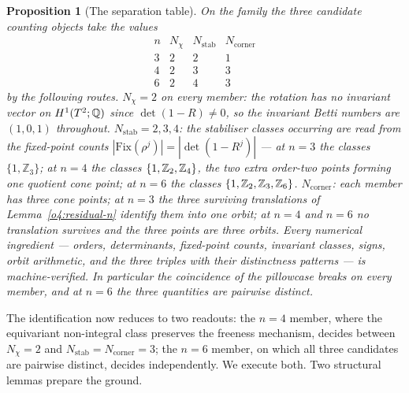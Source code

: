 \documentclass[11pt]{article}
\numberwithin{equation}{section}
\theoremstyle{plain}
\newtheorem{proposition}[theorem]{Proposition}
\theoremstyle{definition}
\theoremstyle{remark}
\newcommand{\Zn}[1][n]{\mathbb{Z}_{#1}}
\begin{document}
\begin{proposition}[The separation table]\label{o4:table}
On the family the three candidate counting objects take the values
\[
\begin{array}{c|ccc}
n & N_{\chi} & N_{\mathrm{stab}} & N_{\mathrm{corner}} \\ \hline
3 & 2 & 2 & 1 \\
4 & 2 & 3 & 3 \\
6 & 2 & 4 & 3
\end{array}
\]
by the following routes. $N_{\chi} = 2$ on every member: the
rotation has no invariant vector on $H^{1}(T^2; \mathbb{Q})$ since
$\det(1 - R) \neq 0$, so the invariant Betti numbers are
$(1, 0, 1)$ throughout. $N_{\mathrm{stab}} = 2, 3, 4$: the
stabiliser classes occurring are read from the fixed-point counts
$|\mathrm{Fix}(\rho^{j})| = |\det(1 - R^{j})|$ --- at $n = 3$ the
classes $\{1, \Zn[3]\}$; at $n = 4$ the classes
$\{1, \Ztwo, \Zn[4]\}$, the two extra order-two points forming one
quotient cone point; at $n = 6$ the classes
$\{1, \Ztwo, \Zn[3], \Zn[6]\}$. $N_{\mathrm{corner}}$: each member
has three cone points; at $n = 3$ the three surviving translations
of Lemma~\textup{\ref{o4:residual-n}} identify them into one orbit;
at $n = 4$ and $n = 6$ no translation survives and the three points
are three orbits. Every numerical ingredient --- orders,
determinants, fixed-point counts, invariant classes, signs, orbit
arithmetic, and the three triples with their distinctness patterns
--- is machine-verified. In particular the coincidence of the
pillowcase breaks on every member, and at $n = 6$ the three
quantities are pairwise distinct.
\end{proposition}

The identification now reduces to two readouts: the $n = 4$
member, where the equivariant non-integral class preserves the
freeness mechanism, decides between $N_{\chi} = 2$ and
$N_{\mathrm{stab}} = N_{\mathrm{corner}} = 3$; the $n = 6$
member, on which all three candidates are pairwise distinct,
decides independently. We execute both. Two structural lemmas
prepare the ground.
\end{document}
